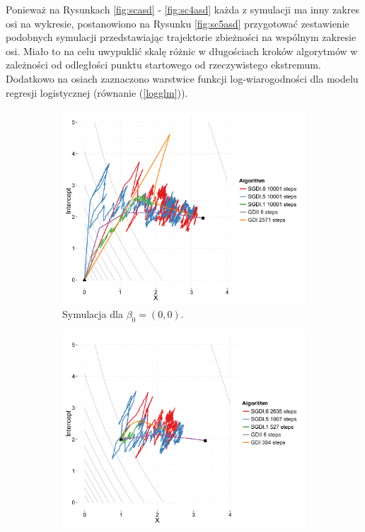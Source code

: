 \newpage

Ponieważ na Rysunkach \ref{fig:scasd} - \ref{fig:sc4asd} każda z symulacji ma inny zakres osi na wykresie, postanowiono na Rysunku \ref{fig:sc5asd} przygotować zestawienie podobnych symulacji przedstawiając trajektorie zbieżności na wspólnym zakresie osi. Miało to na celu uwypuklić skalę różnic w długościach kroków algorytmów w zależności od odległości punktu startowego od rzeczywistego ekstremum. Dodatkowo na osiach zaznaczono warstwice funkcji log-wiarogodności dla modelu regresji logistycznej (równanie (\ref{logglm})).

\begin{figure}[h!]
  \begin{center}
   \begin{subfigure}[h!]{0.45\textwidth}
     \includegraphics[width=\textwidth]{Obrazki/contour_00.pdf}
     \caption{Symulacja dla $\beta_0 = (0,0)$.}
   \end{subfigure}
   \begin{subfigure}[h!]{0.45\textwidth}
        \includegraphics[width=\textwidth]{Obrazki/contour_2_1.pdf}

\end{subfigure}
\end{center}
\end{figure}
